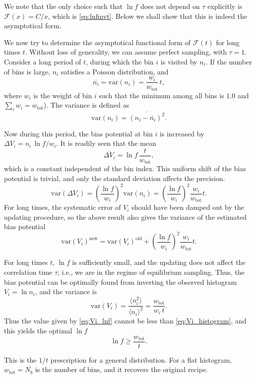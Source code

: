 \documentclass[aip,jcp,preprint,notitlepage, superscriptaddress]{revtex4-1}
\begin{document}
We note that the only choice
such that $\ln f$ does not depend on $\tau$ explicitly
is $\mathcal F(x) = C/x$, which is \eqref{eq:lnfinvt}.
Below we shall show that this is indeed the asymptotical form.


We now try to determine the asymptotical functional form of
$\mathcal F(t)$ for long times $t$.
%
Without loss of generality,
we can assume perfect sampling, with $\tau = 1$.
%
Consider a long period of $t$, during which
the bin $i$ is visited by $n_i$.  If the number of bins is large,
$n_i$ satisfies a Poisson distribution, and
$$
\overline{ n_i }
= \mathrm{var}( n_i )
= \frac{ w_i }{ w_\mathrm{tot} } \, t,
$$
where $w_i$ is the weight of bin $i$ such that the minimum among all bins is $1.0$
and $\sum_i w_i = w_\mathrm{tot}$).
The variance is defined as
$$
\mathrm{var}( n_i )
= \overline{ (n_i - \overline{ n_i } )^2 }.
$$


Now during this period, the bias potential at bin $i$
is increased by $\Delta V_i = n_i \, \ln f / w_i$.
It is readily seen that the mean
$$
\overline{ \Delta V_i }
=
\ln f \, \frac{ t } { w_\mathrm{tot} },
$$
which is a constant independent of the bin index.
%
This uniform shift of the bias potential is trivial,
and only the standard deviation affects the precision.
%
$$
\mathrm{var} (\Delta V_i)
=
\left( \frac{\ln f}{w_i} \right)^2 \mathrm{var}( n_i )
=
\left( \frac{\ln f}{w_i} \right)^2 \frac{w_i}{w_\mathrm{tot}} t.
$$
%
For long times, the systematic error of $V_i$ should have been damped out
by the updating procedure, so the above result also gives
the variance of the estimated bias potential
\begin{equation}
\mathrm{var} ( V_i )^\mathrm{new}
=
\mathrm{var} ( V_i )^\mathrm{old}
+
\left( \frac{\ln f}{w_i} \right)^2 \frac{w_i}{w_\mathrm{tot}} t.
\label{eq:Vi_lnf}
\end{equation}



For long times $t$, $\ln f$ is sufficiently small,
and the updating does not affect the correlation time $\tau$,
i.e., we are in the regime of equilibrium sampling.
%
Thus, the bias potential can be optimally found from inverting the observed histogram
$V_i = \ln n_i$, and the variance is
\begin{equation}
\mathrm{var} (V_i)
=
\frac{ \langle n_i^2 \rangle } { \langle n_i \rangle^2 }
=
\frac{ w_\mathrm{tot} } {w_i \, t}.
\label{eq:Vi_histogram}
\end{equation}
%
Thus the value given by \eqref{eq:Vi_lnf}
cannot be less than \eqref{eq:Vi_histogram},
and this yields
the optimal $\ln f$
\begin{equation}
  \ln f \ge \frac{ w_\mathrm{tot} } { t }.
\end{equation}

This is the $1/t$ prescription for a general distribution.
%
For a flat histogram, $w_\mathrm{tot} = N_b$
is the number of bins, and it recovers
the original recipe\cite{
belardinelli2007, belardinelli2008}.




\end{document}
